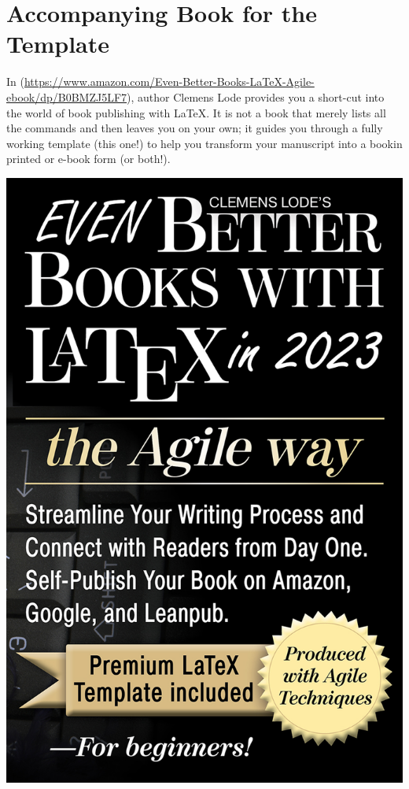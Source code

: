 

\chapter{Accompanying Book for the Template}\label{additional-titles:sec}


In \ifxetex\else{} \citep{eBBWLtAW}\fi (\url{https://www.amazon.com/Even-Better-Books-LaTeX-Agile-ebook/dp/B0BMZJ5LF7}), author Clemens Lode provides you a short-cut into the world of book publishing with LaTeX. It is not a book that merely lists all the commands and then leaves you on your own; it guides you through a fully working template (this one!) to help you transform your manuscript into a book\emph{}in printed or e-book form (or both!).

\begin{center}
\includegraphics[width=.45\textwidth]{images/cover.jpg}
\end{center}

